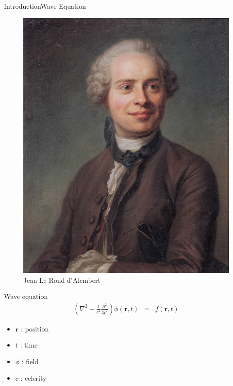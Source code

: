 \documentclass[9pt, xcolor={usenames, dvipsnames}]{beamer}
\begin{document}
				\begin{frame}{Introduction}{Wave Equation}
					\centering
					\begin{minipage}[t]{0.3\textwidth}
						\begin{figure}
							\includegraphics[width=\textwidth]{images/profile/Jean_Le_Rond_d'Alembert,_by_French_school.jpg}
							\caption{Jean Le Rond d'Alembert}
						\end{figure}
					\end{minipage}
					\hfill
					\begin{minipage}[t]{0.6\textwidth}
						\begin{alertblock}{Wave equation}
							\begin{eqnarray}
								\left(\nabla^2 - \frac{1}{c^2} \frac{\partial^2}{\partial t^2} \right) \phi(\mathbf{r}, t) & = & f(\mathbf{r}, t) \label{equation:alembert}
							\end{eqnarray}
							\begin{itemize}
								\item $\mathbf{r}$ : position
								\item $t$ : time
								\item $\phi$ : field
								\item $c$ : celerity 
							\end{itemize}
						\end{alertblock}
					\end{minipage}
				\end{frame}
\end{document}
